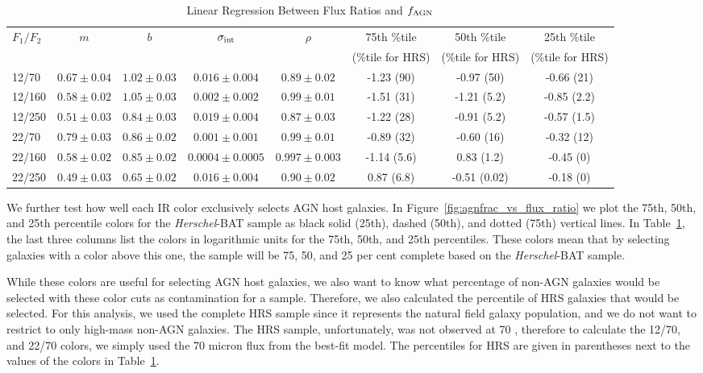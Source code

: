 \documentclass[fleqn, usenatbib]{mnras}
\newcommand{\herschel}{\emph{Herschel}}
\begin{document}
\begin{table}
\begin{threeparttable}
\captionsetup{font=small,labelfont=bf,labelsep=period}
\caption{Linear Regression Between Flux Ratios and $f_{\rm AGN}$\label{tab:flux_ratio_fagn_linreg}}
\begin{tabular}{lccccccc}
\toprule 
$F_{1}/F_{2}$ & $m$ & $b$  & $\sigma_{\rm int}$ & $\rho$ & 75th \%tile  & 50th \%tile  & 25th \%tile\\
&&&&&(\%tile for HRS)&(\%tile for HRS)&(\%tile for HRS)\\
\midrule
12/70      & $0.67\pm0.04$ & $1.02\pm0.03$ & $0.016\pm0.004$ & $0.89\pm0.02$ & -1.23 (90) & -0.97 (50) & -0.66 (21)\\
12/160    & $0.58\pm0.02$ & $1.05\pm0.03$ & $0.002\pm0.002$ & $0.99\pm0.01$ & -1.51 (31) & -1.21 (5.2) & -0.85 (2.2)\\
12/250    & $0.51\pm0.03$ & $0.84\pm0.03$ & $0.019\pm0.004$ & $0.87\pm0.03$ & -1.22 (28) &  -0.91 (5.2) & -0.57 (1.5)\\
22/70      & $0.79\pm0.03$ & $0.86\pm0.02$ & $0.001\pm0.001$ & $0.99\pm0.01$ & -0.89 (32) & -0.60 (16) & -0.32 (12)\\
22/160    & $0.58\pm0.02$ & $0.85\pm0.02$ & $0.0004\pm0.0005$ & $0.997\pm0.003$ & -1.14 (5.6) & 0.83 (1.2) & -0.45 (0)\\
22/250    & $0.49\pm0.03$ & $0.65\pm0.02$ & $0.016\pm0.004$ & $0.90\pm0.02$ & 0.87 (6.8) & -0.51 (0.02) & -0.18 (0) \\
\bottomrule
\end{tabular}
\end{threeparttable}
\end{table}

We further test how well each IR color exclusively selects AGN host galaxies. In Figure~\ref{fig:agnfrac_vs_flux_ratio} we plot the 75th, 50th, and 25th percentile colors for the \herschel-BAT sample as black solid (25th), dashed (50th), and dotted (75th) vertical lines. In Table~\ref{tab:flux_ratio_fagn_linreg}, the last three columns list the colors in logarithmic units for the 75th, 50th, and 25th percentiles. These colors mean that by selecting galaxies with a color above this one, the sample will be 75, 50, and 25 per cent complete based on the \herschel-BAT sample.

While these colors are useful for selecting AGN host galaxies, we also want to know what percentage of non-AGN galaxies would be selected with these color cuts as contamination for a sample. Therefore, we also calculated the percentile of HRS galaxies that would be selected. For this analysis, we used the complete HRS sample since it represents the natural field galaxy population, and we do not want to restrict to only high-mass non-AGN galaxies. The HRS sample, unfortunately, was not observed at 70 \micron, therefore to calculate the 12/70, and 22/70 colors, we simply used the 70 micron flux from the best-fit model. The percentiles for HRS are given in parentheses next to the values of the colors in Table~\ref{tab:flux_ratio_fagn_linreg}. 
\end{document}
